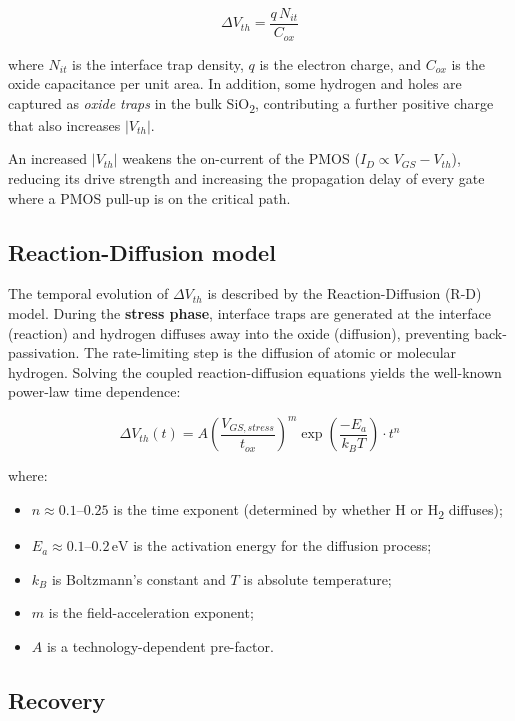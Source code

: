 \documentclass[12pt, a4paper]{report}
\begin{document}
\begin{equation}
  \Delta V_{th} = \frac{q \, N_{it}}{C_{ox}}
\end{equation}

where $N_{it}$ is the interface trap density, $q$ is the electron charge, and $C_{ox}$
is the oxide capacitance per unit area. In addition, some hydrogen and holes are captured
as \emph{oxide traps} in the bulk SiO\textsubscript{2}, contributing a further positive
charge that also increases $|V_{th}|$.

An increased $|V_{th}|$ weakens the on-current of the PMOS ($I_{D} \propto V_{GS} - V_{th}$),
reducing its drive strength and increasing the propagation delay of every gate where
a PMOS pull-up is on the critical path.

\subsection{Reaction-Diffusion model}

The temporal evolution of $\Delta V_{th}$ is described by the Reaction-Diffusion (R-D) model.
During the \textbf{stress phase}, interface traps are generated at the interface (reaction)
and hydrogen diffuses away into the oxide (diffusion), preventing back-passivation. The
rate-limiting step is the diffusion of atomic or molecular hydrogen. Solving the
coupled reaction-diffusion equations yields the well-known power-law time dependence:

\begin{equation}
  \Delta V_{th}(t) = A \left(\frac{V_{GS,stress}}{t_{ox}}\right)^{m} \exp\!\left(\frac{-E_a}{k_B T}\right) \cdot t^{n}
\end{equation}

where:
\begin{itemize}
  \item $n \approx 0.1$--$0.25$ is the time exponent (determined by whether H or H\textsubscript{2} diffuses);
  \item $E_a \approx 0.1$--$0.2\,\text{eV}$ is the activation energy for the diffusion process;
  \item $k_B$ is Boltzmann's constant and $T$ is absolute temperature;
  \item $m$ is the field-acceleration exponent;
  \item $A$ is a technology-dependent pre-factor.
\end{itemize}

\subsection{Recovery}
\end{document}
